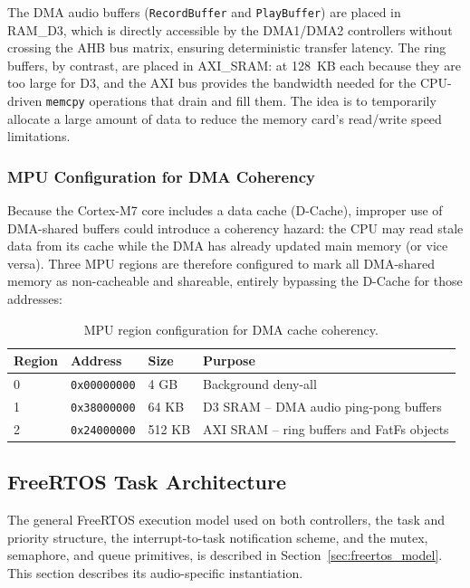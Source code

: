The DMA audio buffers (\texttt{RecordBuffer} and \texttt{PlayBuffer}) are placed in RAM\_D3, which is directly accessible by the DMA1/DMA2 controllers without crossing the AHB bus matrix, ensuring deterministic transfer latency. The ring buffers, by contrast, are placed in AXI\_SRAM: at 128~KB each because they are too large for D3, and the AXI bus provides the bandwidth needed for the CPU-driven \texttt{memcpy} operations that drain and fill them. The idea is to temporarily allocate a large amount of data to reduce the memory card's read/write speed limitations.

\subsubsection{MPU Configuration for DMA Coherency}

Because the Cortex-M7 core includes a data cache (D-Cache), improper use of DMA-shared buffers could introduce a coherency hazard: the CPU may read stale data from its cache while the DMA has already updated main memory (or vice versa). Three MPU regions are therefore configured to mark all DMA-shared memory as non-cacheable and shareable, entirely bypassing the D-Cache for those addresses:

\begin{table}[h!]
  \centering
  \caption{MPU region configuration for DMA cache coherency.}
  \label{tab:mpu}
  \begin{tabular}{|l|l|l|p{5cm}|}
    \hline
    \textbf{Region} & \textbf{Address} & \textbf{Size} & \textbf{Purpose} \\
    \hline
    0 & \texttt{0x00000000} & 4 GB   & Background deny-all \\
    1 & \texttt{0x38000000} & 64 KB  & D3 SRAM – DMA audio ping-pong buffers \\
    2 & \texttt{0x24000000} & 512 KB & AXI SRAM – ring buffers and FatFs objects \\
    \hline
  \end{tabular}
\end{table}

\subsection{FreeRTOS Task Architecture}

The general FreeRTOS execution model used on both controllers, the task and priority structure, the interrupt-to-task notification scheme, and the mutex, semaphore, and queue primitives, is described in Section~\ref{sec:freertos_model}. This section describes its audio-specific instantiation.

